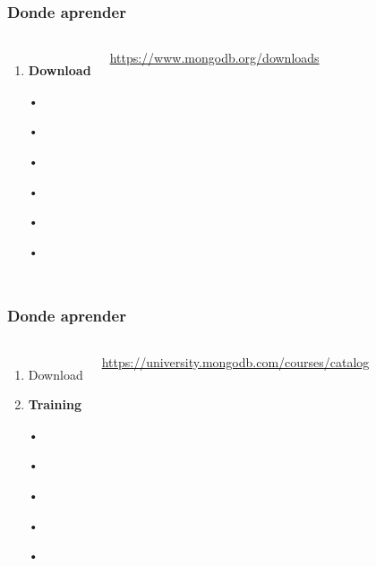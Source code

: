 \documentclass{beamer}
\begin{document}
\begin{frame}
\frametitle{Donde aprender}
\begin{columns}[c] %
\begin{enumerate}
\item \textbf{Download}
\item[•]
\item[•]
\item[•]
\item[•]
\item[•]
\item[•]
\end{enumerate}

{\color{blue}\url{https://www.mongodb.org/downloads}}
\end{columns}
\end{frame}
\begin{frame}
\frametitle{Donde aprender}
\begin{columns}[c] %
\begin{enumerate}
\item Download
\item \textbf{Training}
\item[•]
\item[•]
\item[•]
\item[•]
\item[•]
\end{enumerate}

{\color{blue}\url{https://university.mongodb.com/courses/catalog}}
\end{columns}
\end{frame}
\end{document}
